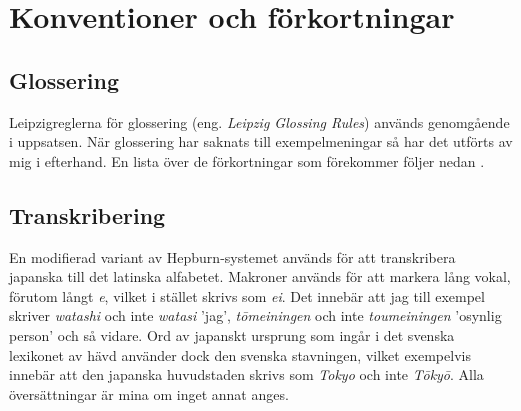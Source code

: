 \documentclass[12pt,a4paper]{article}
\begin{document}

\tableofcontents




\newpage

\listoftables

\listoffigures





\newpage
\section*{Konventioner och förkortningar}

\subsection*{Glossering}
Leipzigreglerna för glossering (eng. \emph{Leipzig Glossing Rules}) används genomgående i uppsatsen. När glossering har saknats till exempelmeningar så har det utförts av mig i efterhand. En lista över de förkortningar som förekommer följer nedan \autocite{comrie2008}.

\subsection*{Transkribering}
En modifierad variant av Hepburn-systemet används för att transkribera japanska till det latinska alfabetet. Makroner används för att markera lång vokal, förutom långt \emph{e}, vilket i stället skrivs som \emph{ei}. Det innebär att jag till exempel skriver \emph{watashi} och inte \emph{watasi} 'jag', \emph{t\=omeiningen} och inte \emph{toumeiningen} 'osynlig person' och så vidare. Ord av japanskt ursprung som ingår i det svenska lexikonet av hävd använder dock den svenska stavningen, vilket exempelvis innebär att den japanska huvudstaden skrivs som \emph{Tokyo} och inte \emph{T\=oky\=o}. Alla översättningar är mina om inget annat anges.
\end{document}

